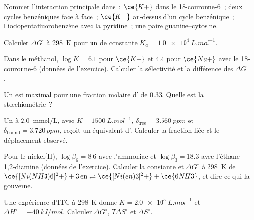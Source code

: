 \begin{exercise}[$\star$]\label{exo:b3:supramolecular:1}
Nommer l'interaction principale dans~: $\ce{K+}$ dans le 18-couronne-6~; deux cycles benzéniques face à face~;
$\ce{K+}$ au-dessus d'un cycle benzénique~; l'iodopentafluorobenzène avec la pyridine~; une paire
guanine--cytosine.
\end{exercise}

\begin{exercise}[$\star$]\label{exo:b3:supramolecular:2}
Calculer $\Delta G^\circ$ à \qty{298}{K} pour un  de constante $K_a = \qty{1.0e4}{L.mol^{-1}}$.
\end{exercise}

\begin{exercise}[$\star$]\label{exo:b3:supramolecular:3}
Dans le méthanol, $\log K = 6.1$ pour $\ce{K+}$ et 4.4 pour $\ce{Na+}$ avec le 18-couronne-6 (données de l'exercice).
Calculer la sélectivité et la différence des $\Delta G^\circ$.
\end{exercise}

\begin{exercise}[$\star$]\label{exo:b3:supramolecular:4}
Un  est maximal pour une fraction molaire d' de 0.33. Quelle est la stœchiométrie~?
\end{exercise}

\begin{exercise}[$\star\star$]\label{exo:b3:supramolecular:5}
Un  à \qty{2.0}{mmol/L}, avec $K = \qty{1500}{L.mol^{-1}}$, $\delta_{\mathrm{free}} = \qty{3.560}{ppm}$ et $\delta_{\mathrm{bound}} = \qty{3.720}{ppm}$, reçoit un
équivalent d'. Calculer la fraction liée et le déplacement observé.
\end{exercise}

\begin{exercise}[$\star\star$]\label{exo:b3:supramolecular:6}
Pour le nickel(II), $\log\beta_6 = 8.6$ avec l'ammoniac et $\log\beta_3 = 18.3$ avec l'éthane-1,2-diamine (données de
l'exercice). Calculer la constante et $\Delta G^\circ$ à \qty{298}{K} de
$\ce{[Ni(NH3)6]^2+} + 3\,\mathrm{en} \rightleftharpoons \ce{[Ni(en)3]^2+} + \ce{6NH3}$, et dire ce qui la gouverne.
\end{exercise}

\begin{exercise}[$\star\star$]\label{exo:b3:supramolecular:7}
Une expérience d'ITC à \qty{298}{K} donne $K = \qty{2.0e5}{L.mol^{-1}}$ et $\Delta H^\circ = \qty{-40}{kJ/mol}$. Calculer $\Delta G^\circ$, $T\Delta S^\circ$ et
$\Delta S^\circ$.
\end{exercise}

